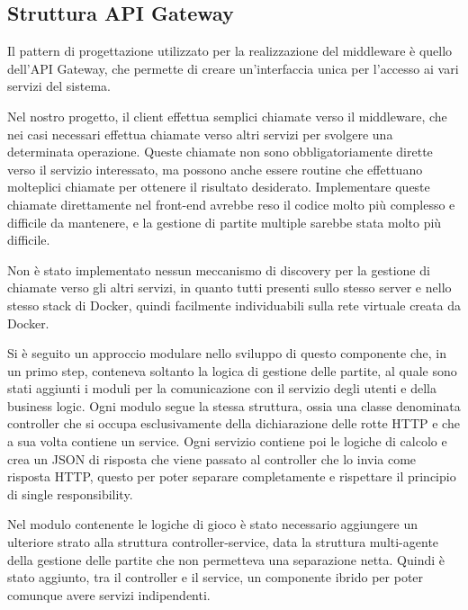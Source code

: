 \subsection{Struttura API Gateway}

Il pattern di progettazione utilizzato per la realizzazione del middleware è quello dell'API Gateway, che permette di creare un'interfaccia unica per l'accesso ai vari servizi del sistema.

Nel nostro progetto, il client effettua semplici chiamate verso il middleware, che nei casi necessari effettua chiamate verso altri servizi per svolgere una determinata operazione.
Queste chiamate non sono obbligatoriamente dirette verso il servizio interessato, ma possono anche essere routine che effettuano molteplici chiamate per ottenere il risultato desiderato. 
Implementare queste chiamate direttamente nel front-end avrebbe reso il codice molto più complesso e difficile da mantenere, e la gestione di partite multiple sarebbe stata molto più difficile.

\vspace{1cm}

Non è stato implementato nessun meccanismo di discovery per la gestione di chiamate verso gli altri servizi, in quanto tutti presenti sullo stesso server e nello stesso stack di Docker, quindi facilmente individuabili sulla rete virtuale creata da Docker.

\vspace{1cm}

Si è seguito un approccio modulare nello sviluppo di questo componente che, in un primo step, conteneva soltanto la logica di gestione delle partite, al quale sono stati aggiunti i moduli per la comunicazione con il servizio degli utenti e della business logic. Ogni modulo segue la stessa struttura, ossia una classe denominata controller che si occupa esclusivamente della dichiarazione delle rotte HTTP e che a sua volta contiene un service. Ogni servizio contiene poi le logiche di calcolo e crea un JSON di risposta che viene passato al controller che lo invia come risposta HTTP, questo per poter separare completamente e rispettare il principio di single responsibility.

Nel modulo contenente le logiche di gioco è stato necessario aggiungere un ulteriore strato alla struttura controller-service, data la struttura multi-agente della gestione delle partite che non permetteva una separazione netta. Quindi è stato aggiunto, tra il controller e il service, un componente ibrido per poter comunque avere servizi indipendenti.

